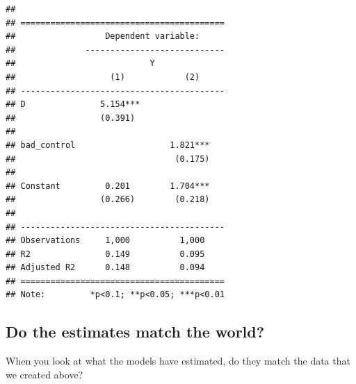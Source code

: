 \documentclass[
]{book}
\begin{document}
\begin{verbatim}
## 
## =========================================
##                  Dependent variable:     
##              ----------------------------
##                           Y              
##                   (1)            (2)     
## -----------------------------------------
## D               5.154***                 
##                 (0.391)                  
##                                          
## bad_control                   1.821***   
##                                (0.175)   
##                                          
## Constant         0.201        1.704***   
##                 (0.266)        (0.218)   
##                                          
## -----------------------------------------
## Observations     1,000          1,000    
## R2               0.149          0.095    
## Adjusted R2      0.148          0.094    
## =========================================
## Note:         *p<0.1; **p<0.05; ***p<0.01
\end{verbatim}

\hypertarget{do-the-estimates-match-the-world}{%
\subsection{Do the estimates match the
world?}\label{do-the-estimates-match-the-world}}

When you look at what the models have estimated, do they match the data
that we created above?
\end{document}
